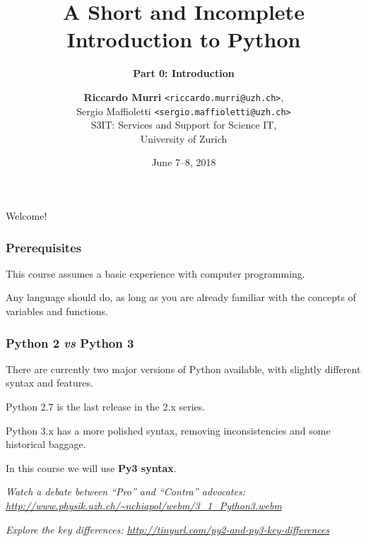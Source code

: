\documentclass[english,serif,mathserif,xcolor=pdftex,dvipsnames,table]{beamer}
\title[Introduction to Python]{%
  A Short and Incomplete Introduction to Python
}
\subtitle{\bfseries Part 0: Introduction}
\author[R.~Murri]{%
  \textbf{Riccardo Murri} \texttt{<riccardo.murri@uzh.ch>}, \\
  Sergio Maffioletti \texttt{<sergio.maffioletti@uzh.ch>}
  \\
  S3IT: Services and Support for Science IT,
  \\
  University of Zurich
}
\date{June 7--8, 2018}
\begin{document}
\maketitle

\begin{frame}
  \begin{center}
    {\Huge Welcome!}
  \end{center}
\end{frame}







\begin{frame}
  \frametitle{Prerequisites}
  This course assumes a basic experience with computer programming.

  \+
  Any language should do, as long as you are already familiar with
  the concepts of variables and functions.
\end{frame}


\begin{frame}[fragile]
  \frametitle{Python 2 \emph{vs} Python 3}

  There are currently two major versions of Python available, with
  slightly different syntax and features.

  \+
  Python 2.7 is the last release in the 2.x series.

  \+
  Python 3.x has a more polished syntax, removing inconsistencies and
  some historical baggage.

  \+
  In this course we will use \textbf{Py3 syntax}.

  \+
  {\footnotesize\em
    Watch a debate between ``Pro'' and ``Contra'' advocates:
    \url{http://www.physik.uzh.ch/~nchiapol/webm/3_1_Python3.webm}}

  \+
  {\footnotesize\em
    Explore the key differences:
    \url{http://tinyurl.com/py2-and-py3-key-differences}}
\end{frame}
\end{document}
